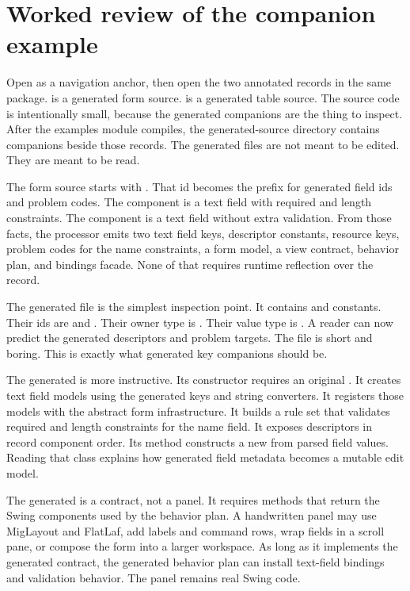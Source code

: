 \section{Worked review of the companion example}

Open \generationExample{} as a navigation anchor, then open the two annotated
records in the same package.  is a generated form source.
 is a generated table source. The source code is intentionally
small, because the generated companions are the thing to inspect. After the
examples module compiles, the generated-source directory contains companions
beside those records. The generated files are not meant to be edited. They are
meant to be read.

The form source starts with . That
id becomes the prefix for generated field ids and problem codes. The
 component is a text field with required and length constraints.
The  component is a text field without extra validation. From
those facts, the processor emits two text field keys, descriptor constants,
resource keys, problem codes for the name constraints, a form model, a view
contract, behavior plan, and bindings facade. None of that requires runtime
reflection over the record.

The generated  file is the simplest inspection point.
It contains  and  constants. Their ids are
 and . Their owner
type is . Their value type is . A reader can
now predict the generated descriptors and problem targets. The file is short
and boring. This is exactly what generated key companions should be.

The generated  is more instructive. Its constructor
requires an original . It creates text field models using
the generated keys and string converters. It registers those models with the
abstract form infrastructure. It builds a rule set that validates required and
length constraints for the name field. It exposes descriptors in record
component order. Its  method constructs a new
 from parsed field values. Reading that class explains how
generated field metadata becomes a mutable edit model.

The generated  is a contract, not a panel. It requires
methods that return the Swing components used by the behavior plan. A
handwritten panel may use MigLayout and FlatLaf, add labels and command rows,
wrap fields in a scroll pane, or compose the form into a larger workspace. As
long as it implements the generated contract, the generated behavior plan can
install text-field bindings and validation behavior. The panel remains real
Swing code.

